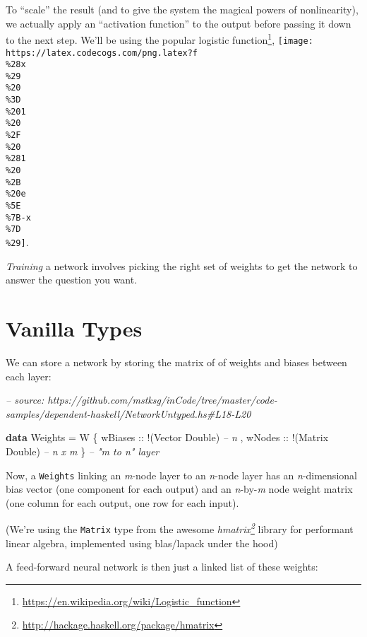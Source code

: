 \documentclass[]{article}
\newenvironment{Shaded}{}{}
\newcommand{\CommentTok}[1]{\textcolor[rgb]{0.38,0.63,0.69}{\textit{#1}}}
\newcommand{\DataTypeTok}[1]{\textcolor[rgb]{0.56,0.13,0.00}{#1}}
\newcommand{\FunctionTok}[1]{\textcolor[rgb]{0.02,0.16,0.49}{#1}}
\newcommand{\KeywordTok}[1]{\textcolor[rgb]{0.00,0.44,0.13}{\textbf{#1}}}
\newcommand{\NormalTok}[1]{#1}
\newcommand{\OtherTok}[1]{\textcolor[rgb]{0.00,0.44,0.13}{#1}}
\renewcommand{\href}[2]{#2\footnote{\url{#1}}}
\begin{document}
To ``scale'' the result (and to give the system the magical powers of
nonlinearity), we actually apply an ``activation function'' to the output before
passing it down to the next step. We'll be using the popular
\href{https://en.wikipedia.org/wiki/Logistic_function}{logistic function},
\texttt{[image: https://latex.codecogs.com/png.latex?f\\\%28x\\\%29\\\%20\\\%3D\\\%201\\\%20\\\%2F\\\%20\\\%281\\\%20\\\%2B\\\%20e\\\%5E\\\%7B-x\\\%7D\\\%29]}.

\emph{Training} a network involves picking the right set of weights to get the
network to answer the question you want.

\hypertarget{vanilla-types}{%
\section{Vanilla Types}\label{vanilla-types}}

We can store a network by storing the matrix of of weights and biases between
each layer:

\begin{Shaded}
\begin{Highlighting}[]
\CommentTok{-- source: https://github.com/mstksg/inCode/tree/master/code-samples/dependent-haskell/NetworkUntyped.hs#L18-L20}

\KeywordTok{data} \DataTypeTok{Weights} \FunctionTok{=} \DataTypeTok{W}\NormalTok{ \{}\OtherTok{ wBiases ::} \FunctionTok{!}\NormalTok{(}\DataTypeTok{Vector} \DataTypeTok{Double}\NormalTok{)  }\CommentTok{-- n}
\NormalTok{                 ,}\OtherTok{ wNodes  ::} \FunctionTok{!}\NormalTok{(}\DataTypeTok{Matrix} \DataTypeTok{Double}\NormalTok{)  }\CommentTok{-- n x m}
\NormalTok{                 \}                              }\CommentTok{-- "m to n" layer}
\end{Highlighting}
\end{Shaded}

Now, a \texttt{Weights} linking an \emph{m}-node layer to an \emph{n}-node layer
has an \emph{n}-dimensional bias vector (one component for each output) and an
\emph{n}-by-\emph{m} node weight matrix (one column for each output, one row for
each input).

(We're using the \texttt{Matrix} type from the awesome
\emph{\href{http://hackage.haskell.org/package/hmatrix}{hmatrix}} library for
performant linear algebra, implemented using blas/lapack under the hood)

A feed-forward neural network is then just a linked list of these weights:
\end{document}
